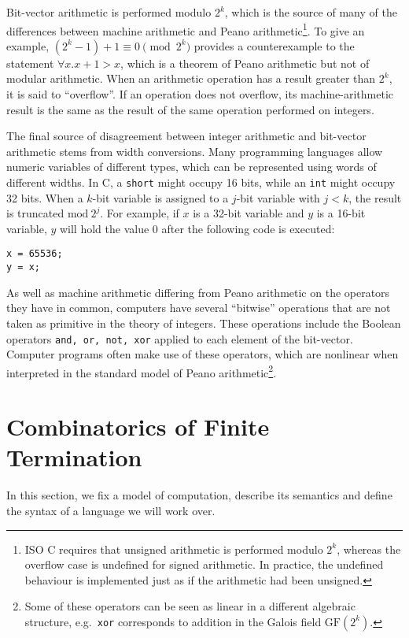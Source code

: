 \documentclass[a4paper]{llncs}
\begin{document}
Bit-vector arithmetic is performed modulo $2^k$, which is the source of many
of the differences between machine arithmetic and Peano
arithmetic\footnote{ISO C requires that unsigned arithmetic is performed
modulo $2^k$, whereas the overflow case is undefined for signed arithmetic. 
In practice, the undefined behaviour is implemented just as if the
arithmetic had been unsigned.}.  To give an example, $(2^k - 1) + 1 \equiv 0
\pmod {2^k}$ provides a counterexample to the statement $\forall x. 
x + 1 > x$, which is a theorem of Peano arithmetic but not of modular
arithmetic.  When an arithmetic operation has a result greater than $2^k$,
it is said to ``overflow''.  If an operation does not overflow, its
machine-arithmetic result is the same as the result of the same operation
performed on integers.

The final source of disagreement between integer arithmetic and bit-vector
arithmetic stems from width conversions.  Many programming languages allow
numeric variables of different types, which can be represented using words
of different widths.  In C, a \texttt{short} might occupy 16 bits, while an
\texttt{int} might occupy 32 bits.  When a $k$-bit variable is assigned to a
$j$-bit variable with $j < k$, the result is truncated $\mathrm{mod}~2^j$.  For
example, if $x$ is a 32-bit variable and $y$ is a 16-bit variable, $y$ will
hold the value $0$ after the following code is executed:
%
\begin{lstlisting}
x = 65536;
y = x;
\end{lstlisting}


As well as machine arithmetic differing from Peano arithmetic on the
operators they have in common, computers have several ``bitwise'' operations
that are not taken as primitive in the theory of integers.  These operations
include the Boolean operators \texttt{and, or, not, xor} applied to each
element of the bit-vector.  Computer programs often make use of these
operators, which are nonlinear when interpreted in the standard model of
Peano arithmetic\footnote{Some of these operators can be seen as
linear in a different algebraic structure, e.g.~\texttt{xor} corresponds to
addition in the Galois field $\mathrm{GF}(2^k)$.}.


\iffalse

\section{Combinatorics of Finite Termination}
In this section, we fix a model of computation, describe its semantics and
define the syntax of a language we will work over.
\end{document}
